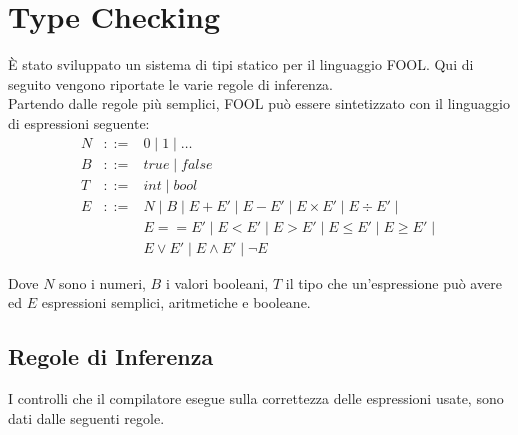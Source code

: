 \documentclass{scrreprt}
\begin{document}
\section{Type Checking}
È stato sviluppato un sistema di tipi statico per il linguaggio FOOL. Qui di seguito vengono riportate le varie regole di inferenza.\\

Partendo dalle regole più semplici, FOOL può essere sintetizzato con il linguaggio di espressioni seguente:
\[
\begin{array}{lcl}
N & ::= & 0 \mid 1 \mid \dots\\ 
B & ::= &  true \mid false \\
T & ::= & int \mid bool \\
E & ::= & N \mid B \mid E + E' \mid E - E' \mid E \times E' \mid E \div E' \mid\\
& & E == E' \mid E < E '\mid E > E' \mid E \le E' \mid E \ge E' \mid \\
& & E \lor E' \mid E \land E' \mid \lnot E 
\end{array}
\]

Dove $N$ sono i numeri, $B$ i valori booleani, $T$ il tipo che un'espressione può avere ed $E$ espressioni semplici, aritmetiche e booleane.
\subsection{Regole di Inferenza}

I controlli che il compilatore esegue sulla correttezza delle espressioni usate, sono dati dalle seguenti regole.
\end{document}
